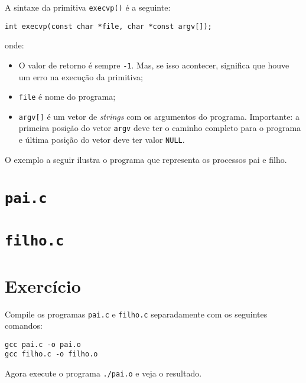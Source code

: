 A sintaxe da primitiva \texttt{execvp()} é a seguinte:

\begin{lstlisting}[style=MyCStyle, frame=none]
int execvp(const char *file, char *const argv[]);
\end{lstlisting}
 
onde: 
\begin{itemize}
    \item O valor de retorno é sempre \texttt{-1}. Mas, se isso acontecer, significa que houve um erro na execução da primitiva;
    \item \texttt{file} é nome do programa;
    \item \texttt{argv[]} é um vetor de \textit{strings} com os argumentos do programa. Importante: a primeira posição do vetor \texttt{argv} deve ter o caminho completo para o programa e última posição do vetor deve ter valor \texttt{NULL}.
 \end{itemize}
 
 O exemplo a seguir ilustra o programa que representa os processos pai e filho. 
 
 \section*{\texttt{pai.c}}
 
 
 \section*{\texttt{filho.c}}
 
 
 \section{Exercício}
 Compile os programas \texttt{pai.c} e \texttt{filho.c} separadamente com os seguintes comandos:

\begin{lstlisting}[style=MyBashStyle]
gcc pai.c -o pai.o
gcc filho.c -o filho.o
\end{lstlisting}


Agora execute o programa \texttt{./pai.o} e veja o resultado.